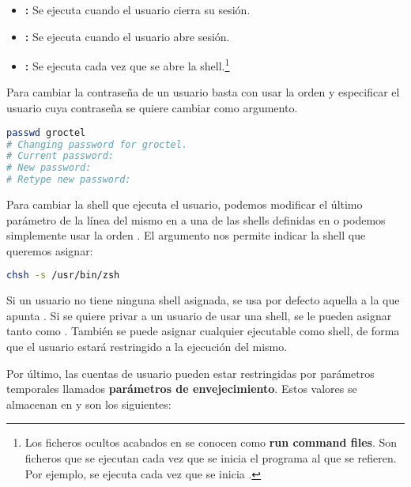 \begin{itemize}
\item{}\textbf{:} Se ejecuta cuando el usuario cierra su sesión.
\item{}\textbf{:} Se ejecuta cuando el usuario abre sesión.
\item{}\textbf{:} Se ejecuta cada vez que se abre la shell.\footnote{Los ficheros ocultos acabados en  se conocen como \textbf{run command files}. Son ficheros que se ejecutan cada vez que se inicia el programa al que se refieren. Por ejemplo,  se ejecuta cada vez que se inicia .}
\end{itemize}

Para cambiar la contraseña de un usuario basta con usar la orden  y especificar el usuario cuya contraseña se quiere cambiar como argumento.

\begin{lstlisting}[language=Bash]
passwd groctel
# Changing password for groctel.
# Current password:
# New password:
# Retype new password:
\end{lstlisting}

Para cambiar la shell que ejecuta el usuario, podemos modificar el último parámetro de la línea del mismo en  a una de las shells definidas en  o podemos simplemente usar la orden .
El argumento  nos permite indicar la shell que queremos asignar:

\begin{lstlisting}[language=Bash]
chsh -s /usr/bin/zsh
\end{lstlisting}

Si un usuario no tiene ninguna shell asignada, se usa por defecto aquella a la que apunta .
Si se quiere privar a un usuario de usar una shell, se le pueden asignar tanto  como .
También se puede asignar cualquier ejecutable como shell, de forma que el usuario estará restringido a la ejecución del mismo.

Por último, las cuentas de usuario pueden estar restringidas por parámetros temporales llamados \textbf{parámetros de envejecimiento}.
Estos valores se almacenan en  y son los siguientes:

